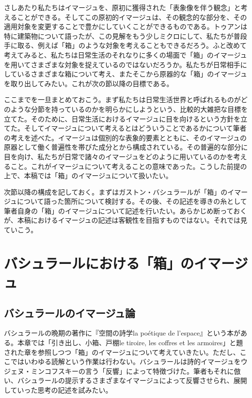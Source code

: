 \documentclass[b5j,twoside,twocolumn]{utarticle}
\begin{document}
さしあたり私たちはイマージュを、原初に獲得された「表象像を伴う観念」と考えることができる。そしてこの原初的イマージュは、その観念的な部分を、その適用対象を変更することで豊かにしていくことができるものである。トゥアンは特に建築物について語ったが、この見解をもう少しミクロにして、私たちが普段手に取る、例えば「箱」のような対象を考えることもできるだろう。ふと改めて考えてみると、私たちは日常生活のそれなりに多くの場面で「箱」のイマージュを用いてさまざまな対象を捉えているのではないだろうか。私たちが日常相手にしているさまざまな箱について考え、またそこから原器的な「箱」のイマージュを取り出してみたい。これが次の節以降の目標である。


ここまでを一旦まとめておこう。まず私たちは日常生活世界と呼ばれるものがどのような分節を持っているのかを明らかにしようという、比較的大雑把な目標を立てた。そのために、日常生活におけるイマージュに目を向けるという方針を立てた。そしてイマージュについて考えるとはどういうことであるかについて筆者の考えを述べた。イマージュは個別的な表象的要素とともに、そのイマージュの原器として働く普遍性を帯びた成分とから構成されている。その普遍的な部分に目を向け、私たちが日常で諸々のイマージュをどのように用いているのかを考えること。これがイマージュについて考えることの意味であった。こうした前提の上で、本稿では「箱」のイマージュについて扱いたい。


次節以降の構成を記しておく。まずはガストン・バシュラールが「箱」のイマージュについて語った箇所について検討する。その後、その記述を導きの糸として筆者自身の「箱」のイマージュについて記述を行いたい。あらかじめ断っておくが、本稿におけるイマージュの記述は客観性を目指すものではない。それでは見ていこう。

\section{バシュラールにおける「箱」のイマージュ}
\subsection{バシュラールのイマージュ論}
バシュラールの晩期の著作に『空間の詩学la poétique de l'espace』という本がある。本章では「引き出し、小箱、戸棚le tiroire, les coffres et les armoires」と題された章を参照しつつ「箱」のイマージュについて考えていきたい。ただし、ここではいわゆる読解という作業は行わない。バシュラールは詩的イマージュをウジェヌ・ミンコフスキーの言う「反響」によって特徴づけた。筆者もそれに倣い、バシュラールの提示するさまざまなイマージュによって反響させられ、展開していった思考の記述を試みたい。
\end{document}
